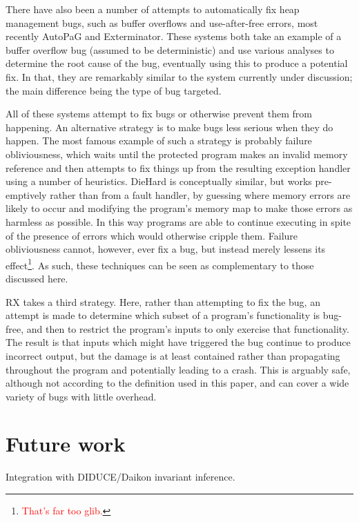 \documentclass[10pt,twocolumn,preprint,natbib,authoryear]{sigplanconf}
\newcommand{\editorial}[1]{\textcolor{red}{\footnote{\textcolor{red}{#1}}}}
\begin{document}
There have also been a number of attempts to automatically fix heap
management bugs, such as buffer overflows and use-after-free errors,
most recently AutoPaG\cite{Lin2007} and Exterminator\cite{Novark2007}.
These systems both take an example of a buffer overflow bug (assumed
to be deterministic) and use various analyses to determine the root
cause of the bug, eventually using this to produce a potential fix.
In that, they are remarkably similar to the system currently under
discussion; the main difference being the type of bug targeted.

All of these systems attempt to fix bugs or otherwise prevent them
from happening.  An alternative strategy is to make bugs less serious
when they do happen.  The most famous example of such a strategy is
probably failure obliviousness\cite{Rinard2004}, which waits until the
protected program makes an invalid memory reference and then attempts
to fix things up from the resulting exception handler using a number
of heuristics.  DieHard\cite{Berger2006} is conceptually similar, but
works pre-emptively rather than from a fault handler, by guessing
where memory errors are likely to occur and modifying the program's
memory map to make those errors as harmless as possible.  In this way
programs are able to continue executing in spite of the presence of
errors which would otherwise cripple them.  Failure obliviousness
cannot, however, ever fix a bug, but instead merely lessens its
effect\editorial{That's far too glib.}.  As such, these techniques can
be seen as complementary to those discussed here.

RX\cite{Qin2007} takes a third strategy.  Here, rather than
attempting to fix the bug, an attempt is made to determine which
subset of a program's functionality is bug-free, and then to restrict
the program's inputs to only exercise that functionality.  The result
is that inputs which might have triggered the bug continue to produce
incorrect output, but the damage is at least contained rather than
propagating throughout the program and potentially leading to a crash.
This is arguably safe, although not according to the definition used
in this paper, and can cover a wide variety of bugs with little
overhead.

\section{Future work}

Integration with DIDUCE/Daikon invariant inference.
\end{document}

